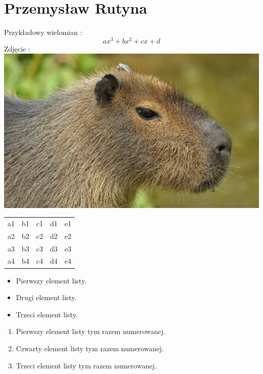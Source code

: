 \section{Przemysław Rutyna} 
\label{sec:prutyna}
Przykładowy wielomian : 
\[ ax^3 + bx^2 + cx + d\]
Zdjęcie : 
\includegraphics{pictures/Pszym/cap.jpg}
\begin{table}
\begin{tabular}{lllll}
a1 & b1 & c1 & d1 & e1 \\
a2 & b2 & c2 & d2 & e2 \\
a3 & b3 & c3 & d3 & e3 \\
a4 & b4 & c4 & d4 & e4
\end{tabular}
\end{table}
\begin{itemize}
  \item Pierwszy element listy.
  \item Drugi element listy.
  \item Trzeci element listy.
\end{itemize}
\begin{enumerate}
  \item Pierwszy element listy tym razem numerowanej.
  \item Czwarty element listy tym razem numerowanej.
  \item Trzeci element listy tym razem numerowanej.
\end{enumerate}
